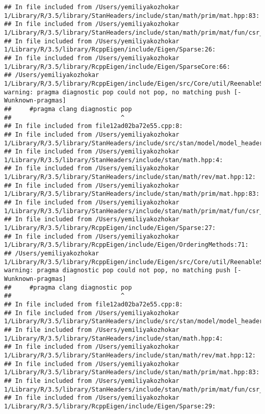 \documentclass[]{article}
\begin{document}
\begin{verbatim}
## In file included from /Users/yemiliyakozhokar 1/Library/R/3.5/library/StanHeaders/include/stan/math/prim/mat.hpp:83:
## In file included from /Users/yemiliyakozhokar 1/Library/R/3.5/library/StanHeaders/include/stan/math/prim/mat/fun/csr_extract_u.hpp:6:
## In file included from /Users/yemiliyakozhokar 1/Library/R/3.5/library/RcppEigen/include/Eigen/Sparse:26:
## In file included from /Users/yemiliyakozhokar 1/Library/R/3.5/library/RcppEigen/include/Eigen/SparseCore:66:
## /Users/yemiliyakozhokar 1/Library/R/3.5/library/RcppEigen/include/Eigen/src/Core/util/ReenableStupidWarnings.h:10:30: warning: pragma diagnostic pop could not pop, no matching push [-Wunknown-pragmas]
##     #pragma clang diagnostic pop
##                              ^
## In file included from file12ad02ba72e55.cpp:8:
## In file included from /Users/yemiliyakozhokar 1/Library/R/3.5/library/StanHeaders/include/src/stan/model/model_header.hpp:4:
## In file included from /Users/yemiliyakozhokar 1/Library/R/3.5/library/StanHeaders/include/stan/math.hpp:4:
## In file included from /Users/yemiliyakozhokar 1/Library/R/3.5/library/StanHeaders/include/stan/math/rev/mat.hpp:12:
## In file included from /Users/yemiliyakozhokar 1/Library/R/3.5/library/StanHeaders/include/stan/math/prim/mat.hpp:83:
## In file included from /Users/yemiliyakozhokar 1/Library/R/3.5/library/StanHeaders/include/stan/math/prim/mat/fun/csr_extract_u.hpp:6:
## In file included from /Users/yemiliyakozhokar 1/Library/R/3.5/library/RcppEigen/include/Eigen/Sparse:27:
## In file included from /Users/yemiliyakozhokar 1/Library/R/3.5/library/RcppEigen/include/Eigen/OrderingMethods:71:
## /Users/yemiliyakozhokar 1/Library/R/3.5/library/RcppEigen/include/Eigen/src/Core/util/ReenableStupidWarnings.h:10:30: warning: pragma diagnostic pop could not pop, no matching push [-Wunknown-pragmas]
##     #pragma clang diagnostic pop
##                              ^
## In file included from file12ad02ba72e55.cpp:8:
## In file included from /Users/yemiliyakozhokar 1/Library/R/3.5/library/StanHeaders/include/src/stan/model/model_header.hpp:4:
## In file included from /Users/yemiliyakozhokar 1/Library/R/3.5/library/StanHeaders/include/stan/math.hpp:4:
## In file included from /Users/yemiliyakozhokar 1/Library/R/3.5/library/StanHeaders/include/stan/math/rev/mat.hpp:12:
## In file included from /Users/yemiliyakozhokar 1/Library/R/3.5/library/StanHeaders/include/stan/math/prim/mat.hpp:83:
## In file included from /Users/yemiliyakozhokar 1/Library/R/3.5/library/StanHeaders/include/stan/math/prim/mat/fun/csr_extract_u.hpp:6:
## In file included from /Users/yemiliyakozhokar 1/Library/R/3.5/library/RcppEigen/include/Eigen/Sparse:29:

\end{verbatim}
\end{document}
